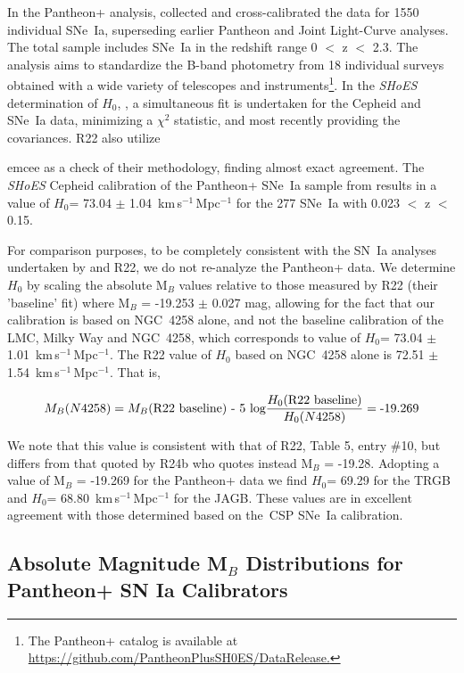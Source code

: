 \documentclass[12pt,modern]{aastex631}
\newcommand{\csp}{\,CSP\xspace}
\newcommand{\ho}{$H_{0}$\xspace}
\newcommand{\hounits}{\,km\,s$^{-1}$\,Mpc$^{-1}$\xspace}
\newcommand{\sne}{SNe~Ia\xspace}
\newcommand{\sn}{SN~Ia\xspace}
\newcommand{\shoes}{\emph{SHoES}\xspace}
\newcommand{\ngc}{NGC\,\xspace}
\begin{document}
In the Pantheon+ analysis, \cite{scolnic_2022} collected and cross-calibrated the data for 1550  individual \sne,  superseding earlier Pantheon \citep{scolnic_2018} and Joint Light-Curve \citep{betoule_2014} analyses. The total sample includes \sne in the redshift range 0 $<$ z $<$ 2.3. The analysis aims to standardize the B-band photometry from 18 individual surveys obtained with a wide variety of telescopes and instruments\footnote{ The Pantheon+ catalog is available at \url{https://github.com/PantheonPlusSH0ES/DataRelease.}}. In the \shoes determination of \ho, \citep[e.g.,][]{riess_2009, riess_2022}, a simultaneous fit is undertaken for the Cepheid and \sne data,  minimizing a $\chi^2$ statistic, and most recently providing the covariances. R22 also utilize {{\ttfamily emcee} as a check of their methodology, finding almost exact agreement.  The \shoes Cepheid calibration of the Pantheon+ \sne sample from \cite{scolnic_2022} results in a value of \ho = 73.04 $\pm$ 1.04 \hounits for the 277 \sne with 0.023 $<$ z $<$ 0.15.

 

 For comparison purposes, to be completely consistent with the \sn analyses undertaken by \citet{scolnic_2022} and R22, we do not re-analyze the Pantheon+ data. We determine \ho by scaling the absolute M$_B$ values relative to those measured by R22 (their 'baseline' fit) where M$_B$ = -19.253 $\pm$ 0.027 mag, allowing for the fact that our calibration is based on \ngc 4258 alone, and not the baseline calibration of the LMC, Milky Way and \ngc 4258, which corresponds to value of \ho = 73.04 $\pm$ 1.01 \hounits. The R22 value of \ho based on \ngc 4258 alone is  72.51 $\pm$  1.54 \hounits. That is,
 
 \begin{equation}
\label{eq:weights}
M_B (N4258)  = M_B(\textrm{R22 baseline) - 5 log} { H_0 (\textrm{R22 baseline)} \over H_0 (N4258) 
} 
= \textrm{-19.269}
\end{equation}

 \noindent
 We note that this value is consistent with that of R22, Table 5, entry \#10, but differs from that quoted by R24b who quotes instead  M$_B$ = -19.28.  Adopting a value of M$_B$ = -19.269 for the Pantheon+ data we find 
 \ho = 69.29 for the TRGB and \ho = 68.80  \hounits for the JAGB. These values are in excellent agreement with those determined based on the \csp 
\sne calibration. 


\subsection{Absolute Magnitude M$_B$ Distributions for Pantheon+ SN Ia Calibrators }
\label{sec:compareMBhists}

}
\end{document}
